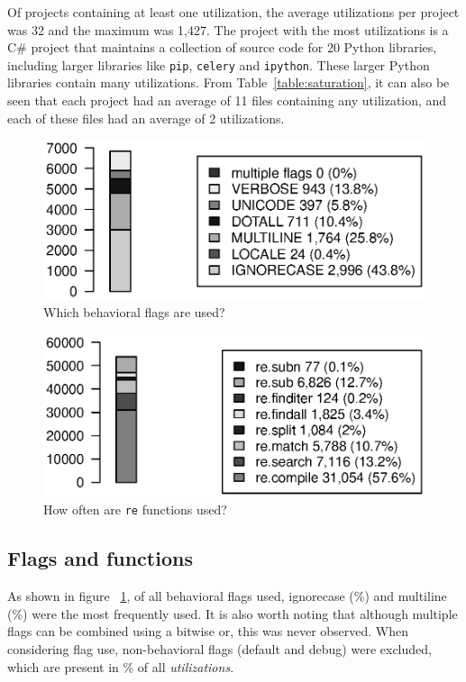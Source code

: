 Of projects containing at least one utilization, the average utilizations per project was 32 and the maximum  was 1,427.  The project with the most utilizations is a C\# project that maintains a collection of source code for 20 Python libraries, including larger libraries like {\tt pip}, {\tt celery} and {\tt ipython}.  These larger Python libraries contain many utilizations.
From Table~\ref{table:saturation}, it can also be seen that each project had an average of 11 files containing any utilization, and each of these files had an average of 2 utilizations.

\begin{figure}[tb]
\centering
\includegraphics[width=0.9\columnwidth]{nontex/illustrations/partFlags.eps}
\vspace{-6pt}
\caption{Which behavioral flags are used?}
\vspace{-6pt}
\label{fig:partFlags}
\end{figure}

\begin{figure}[tb]
\centering
\includegraphics[width=\columnwidth]{nontex/illustrations/partFunctions.eps}
\vspace{-12pt}
\caption{How often are  {\tt re} functions used?}
\vspace{-6pt}
\label{fig:partFunctions}
\end{figure}

\subsection{Flags and functions}
As shown in figure ~\ref{fig:partFlags}, of all behavioral flags used, ignorecase (\%) and multiline (\%) were the most frequently used.  It is also worth noting that although multiple flags can be combined using a bitwise or, this was never observed.
When considering flag use, non-behavioral flags (default and debug) were excluded, which are present in \% of all \emph{utilizations}.

